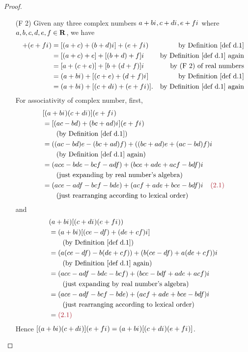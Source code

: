 \begin{proof}
\begin{enumerate}
\item[(F 2)] Given any three complex numbers \(a + b {i\mkern1mu}, c + d {i\mkern1mu}, e + f {i\mkern1mu}\) where \(a, b, c, d, e, f \in \mathbf{R}\), we have
\begin{align*}
    [(a + b\iu) + (c + d\iu)] + (e + f\iu) & = [(a + c) + (b + d)\iu] + (e + f\iu) & \text{by \DEF{d.1}} \\
        & = [(a + c) + e] + [(b + d) + f]\iu & \text{by \DEF{d.1} again} \\
        & = [a + (c + e)] + [b + (d + f)]\iu & \text{by (F 2) of real numbers} \\
        & = (a + b\iu) + [(c + e) + (d + f)\iu] & \text{by \DEF{d.1}} \\
        & = (a + b\iu) + [(c + d\iu) + (e + f\iu)]. & \text{by \DEF{d.1} again}
\end{align*}
For associativity of complex number, first,
\begin{align*}
    & [(a + b\iu)(c + d\iu)](e + f \iu) \\
    & = [(ac - bd) + (bc + ad)\iu] (e + f\iu) \\
    & \quad \quad \text{(by \DEF{d.1})} \\
    & = ((ac - bd)e - (bc + ad)f) + ((bc + ad)e + (ac - bd)f)\iu \\
    & \quad \quad \text{(by \DEF{d.1} again)} \\
    & = (ace - bde - bcf - adf) + (bce + ade + acf - bdf) \iu \\
    & \quad \quad \text{(just expanding by real number's algebra)} \\
    & = (ace - adf - bcf - bde) + (acf + ade + bce - bdf) \iu \quad \MAROON{(2.1)} \\
    & \quad \quad \text{(just rearranging according to lexical order)}
\end{align*}
and
\begin{align*}
    & (a + b \iu)[(c + d\iu)(e + f\iu)) \\
    & = (a + b\iu)[(ce - df) + (de + cf)\iu] \\
    & \quad \quad \text{(by \DEF{d.1})} \\
    & = (a(ce - df) - b(de + cf)) + (b(ce - df) + a(de + cf)) \iu \\
    & \quad \quad \text{(by \DEF{d.1} again)} \\
    & = (ace - adf - bde - bcf) + (bce - bdf + ade + acf)\iu \\
    & \quad \quad \text{(just expanding by real number's algebra)} \\
    & = (ace - adf - bcf - bde) + (acf + ade + bce - bdf)\iu \\
    & \quad \quad \text{(just rearranging according to lexical order)} \\
    & = \MAROON{(2.1)}
\end{align*}
Hence \([(a + b{i\mkern1mu})(c + d{i\mkern1mu})](e + f {i\mkern1mu}) = (a + b {i\mkern1mu})[(c + d{i\mkern1mu})(e + f{i\mkern1mu})]\).


\end{enumerate}
\end{proof}
